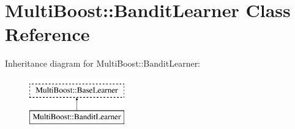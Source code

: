 \hypertarget{classMultiBoost_1_1BanditLearner}{
\section{MultiBoost::BanditLearner Class Reference}
\label{classMultiBoost_1_1BanditLearner}
}
Inheritance diagram for MultiBoost::BanditLearner:\begin{figure}[H]
\begin{center}
\leavevmode
\includegraphics[height=2.000000cm]{classMultiBoost_1_1BanditLearner}
\end{center}
\end{figure}
